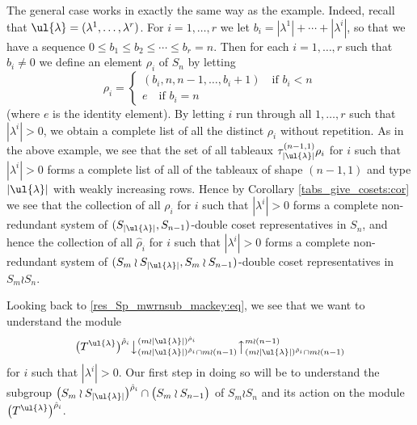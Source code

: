 The general case works in exactly the same way as the example. Indeed, recall that $\ul{\lambda} = (\lambda^1,\ldots,\lambda^r)$. For
$i=1,\ldots,r$ we let $b_i = |\lambda^1|+\cdots+|\lambda^i|$, so that we have a sequence $0 \leq b_1 \leq b_2 \leq \cdots \leq b_r = n$.
Then for each $i=1,\ldots,r$ such that $b_i \neq 0$ we define an element $\rho_i$ of $S_n$ by letting
\[
\rho_i = \begin{cases}
(b_i,n,n-1,\ldots,b_i+1) \quad\text{if $b_i < n$}\\
e \quad\text{if $b_i = n$}
\end{cases}
\]
(where $e$ is the identity element). By letting $i$ run through all $1,\ldots,r$ such that $|\lambda^i| > 0$, we obtain a complete list
of all the distinct $\rho_i$ without repetition. As in the above example, we see that the set of all tableaux
$\tau^{(n-1,1)}_{|\ul{\lambda}|}\rho_i$ for $i$ such that $|\lambda^i| > 0$ forms a complete list of all of the tableaux of shape $(n-1,1)$
and type $|\ul{\lambda}|$ with weakly increasing rows. Hence by Corollary \ref{tabs_give_cosets:cor} we see that the collection of all
$\rho_i$ for $i$ such that $|\lambda^i| > 0$ forms a complete non-redundant system of $(S_{|\ul{\lambda}|},S_{n-1})$-double coset
representatives in $S_n$, and hence the collection of all $\hat\rho_i$ for $i$ such that $|\lambda^i| > 0$ forms a complete non-redundant
system of $(S_m \wr S_{|\ul{\lambda}|},S_m \wr S_{n-1})$-double coset representatives in $S_m \wr S_n$.

Looking back to \eqref{res_Sp_mwrnsub_mackey:eq}, we see that we want to understand the module
\[
\bigl(T^{\ul{\lambda}}\bigr)^{\hat\rho_i}\bigl\downarrow^{(m{\wr}|\ul{\lambda}|)^{\hat\rho_i}}_{(m{\wr}|\ul{\lambda}|)^{\hat\rho_i} \cap m \wr (n-1)}
\bigl\uparrow^{m \wr (n-1)}_{(m{\wr}|\ul{\lambda}|)^{\hat\rho_i} \cap m \wr (n-1)}
\]
for $i$ such that $|\lambda^i|>0$. Our first step in doing so will be to understand the subgroup
$\bigl(S_m \wr S_{|\ul{\lambda}|}\bigr)^{\hat\rho_i}\cap\bigl(S_m \wr S_{n-1}\bigr)$ of $S_m \wr S_n$ and its action on the module
$\bigl(T^{\ul{\lambda}}\bigr)^{\hat\rho_i}$.

